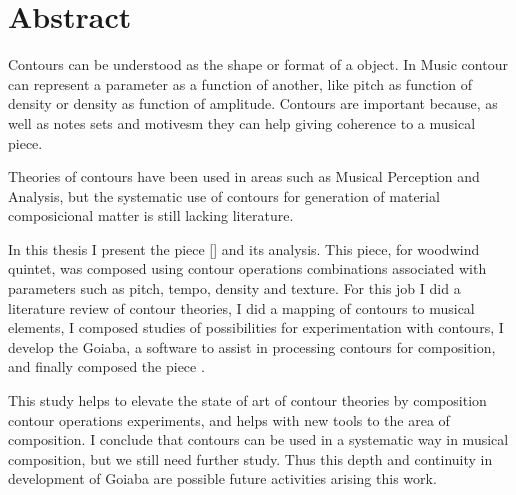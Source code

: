 \chapter*{Abstract}
\label{cha:abstract}

Contours can be understood as the shape or format of a object. In
Music contour can represent a parameter as a function of another, like
pitch as function of density or density as function of
amplitude. Contours are important because, as well as notes sets and
motivesm they can help giving coherence to a musical piece.

Theories of contours have been used in areas such as Musical
Perception and Analysis, but the systematic use of contours for
generation of material composicional matter is still lacking
literature.

In this thesis I present the piece \obra{} [] and its analysis. This piece, for woodwind quintet,
was composed using contour operations combinations associated with
parameters such as pitch, tempo, density and texture. For this job I
did a literature review of contour theories, I did a mapping of
contours to musical elements, I composed studies of possibilities for
experimentation with contours, I develop the Goiaba, a software to
assist in processing contours for composition, and finally composed
the piece \obra{}.

This study helps to elevate the state of art of contour theories by
composition contour operations experiments, and helps with new tools
to the area of composition.
I conclude that contours can be used in a systematic way in musical
composition, but we still need further study. Thus this depth and
continuity in development of Goiaba are possible future activities
arising this work.
